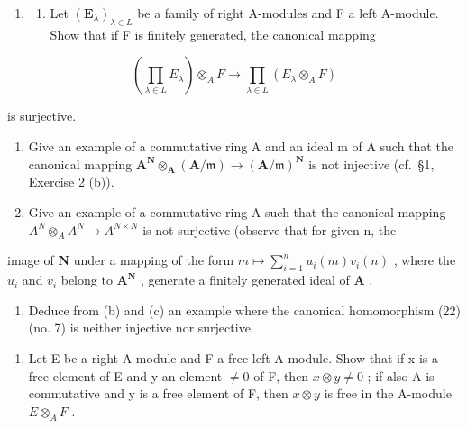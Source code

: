 \begin{enumerate}
\def\labelenumi{\arabic{enumi}.}
\setcounter{enumi}{2}
\tightlist
\item
  \begin{enumerate}
  \def\labelenumii{(\alph{enumii})}
  \tightlist
  \item
    Let \((\mathbf{E}_{\lambda})_{\lambda \in L}\) be a family of right A-modules and F a left A-module. Show that if F is finitely generated, the canonical mapping
  \end{enumerate}
\end{enumerate}

\[
\left(\prod_ {\lambda \in L} E _ {\lambda}\right) \otimes_ {A} F \rightarrow \prod_ {\lambda \in L} (E _ {\lambda} \otimes_ {A} F)
\]

is surjective.

\begin{enumerate}
\def\labelenumi{(\alph{enumi})}
\setcounter{enumi}{1}
\item
  Give an example of a commutative ring A and an ideal m of A such that the canonical mapping \(\mathbf{A}^{\mathbf{N}}\otimes_{\mathbf{A}}(\mathbf{A}/\mathfrak{m})\to(\mathbf{A}/\mathfrak{m})^{\mathbf{N}}\) is not injective (cf.~§1, Exercise 2 (b)).
\item
  Give an example of a commutative ring A such that the canonical mapping \(A^{N} \otimes_{A} A^{N} \to A^{N \times N}\) is not surjective (observe that for given n, the
\end{enumerate}

image of \(\mathbf{N}\) under a mapping of the form \(m \mapsto \sum_{i=1}^{n} u_i(m)v_i(n)\) , where the \(u_i\) and \(v_i\) belong to \(\mathbf{A}^{\mathbf{N}}\) , generate a finitely generated ideal of \(\mathbf{A}\) .

\begin{enumerate}
\def\labelenumi{(\alph{enumi})}
\setcounter{enumi}{3}
\tightlist
\item
  Deduce from (b) and (c) an example where the canonical homomorphism (22) (no. 7) is neither injective nor surjective.
\end{enumerate}

\begin{enumerate}
\def\labelenumi{\arabic{enumi}.}
\setcounter{enumi}{3}
\tightlist
\item
  Let E be a right A-module and F a free left A-module. Show that if x is a free element of E and y an element \(\neq0\) of F, then \(x\otimes y\neq0\) ; if also A is commutative and y is a free element of F, then \(x\otimes y\) is free in the A-module \(E\otimes_{A}F\) .
\end{enumerate}

